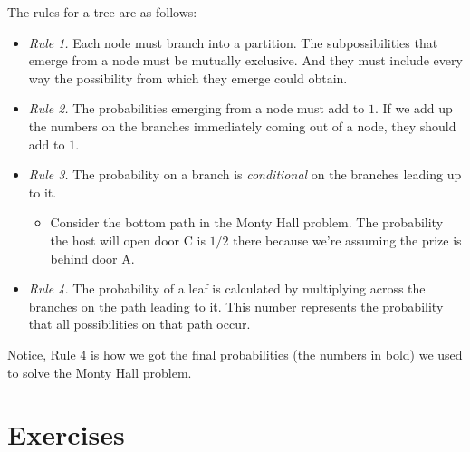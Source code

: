 \documentclass[justified]{tufte-book}
\providecommand{\tightlist}{%
  \setlength{\itemsep}{0pt}\setlength{\parskip}{0pt}}
\theoremstyle{definition}
\theoremstyle{definition}
\theoremstyle{definition}
\theoremstyle{remark}
\begin{document}
The rules for a tree are as follows:
\begin{itemize}
\item[]\emph{Rule 1.} Each node must branch into a partition. The subpossibilities that emerge from a node must be mutually exclusive. And they must include every way the possibility from which they emerge could obtain.
\item[]\emph{Rule 2.} The probabilities emerging from a node must add to \(1\). If we add up the numbers on the branches immediately coming out of a node, they should add to \(1\).
\item[]\emph{Rule 3.} The probability on a branch is \emph{conditional} on the branches leading up to it.
\begin{itemize}
\tightlist
\item[] Consider the bottom path in the Monty Hall problem. The probability the host will open door C is \(1/2\) there because we're assuming the prize is behind door A.
\end{itemize}
\item[]\emph{Rule 4.} The probability of a leaf is calculated by multiplying across the branches on the path leading to it. This number represents the probability that all possibilities on that path occur.
\end{itemize}
Notice, Rule 4 is how we got the final probabilities (the numbers in bold) we used to solve the Monty Hall problem.

\hypertarget{exercises}{%
\section*{Exercises}\label{exercises}}
\end{document}

